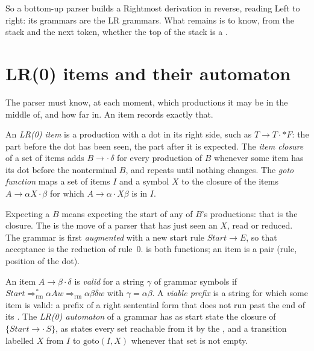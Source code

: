 So a bottom-up parser builds a Rightmost derivation in reverse, reading Left to right: its grammars are the LR grammars. What remains is to know, from the stack and the next token, whether the top of the stack is a .

\section{LR(0) items and their automaton}\label{sec:b3:bottom-up-parsing:items}

The parser must know, at each moment, which productions it may be in the middle of, and how far in. An item records exactly that.

\begin{definition}\label{def:b3:bottom-up-parsing:items}
An \emph{LR(0) item} is a production with a dot in its right side, such as $T \to T \cdot * F$: the part before the dot has been seen, the part after it is expected. The \emph{item closure} of a set of items adds $B \to \cdot\,\delta$ for every production of $B$ whenever some item has its dot before the nonterminal $B$, and repeats until nothing changes. The \emph{goto function} maps a set of items $I$ and a symbol $X$ to the closure of the items $A \to \alpha X \cdot \beta$ for which $A \to \alpha \cdot X \beta$ is in $I$.
\end{definition}

Expecting a $B$ means expecting the start of any of $B$'s productions: that is the closure. The  is the move of a parser that has just seen an $X$, read or reduced. The grammar is first \emph{augmented} with a new start rule $\mathit{Start} \to E$, so that acceptance is the reduction of rule~0.  is both functions; an item is a pair (rule, position of the dot).

\label{lst:b3:bottom-up-parsing:items}

\begin{definition}\label{def:b3:bottom-up-parsing:automaton}
An item $A \to \beta \cdot \delta$ is \emph{valid} for a string $\gamma$ of grammar symbols if $\mathit{Start} \Rightarrow^*_{\mathrm{rm}} \alpha A w \Rightarrow_{\mathrm{rm}} \alpha\beta\delta w$ with $\gamma = \alpha\beta$. A \emph{viable prefix} is a string for which some item is valid: a prefix of a right sentential form that does not run past the end of its . The \emph{LR(0) automaton} of a grammar has as start state the closure of $\{\mathit{Start} \to \cdot\,S\}$, as states every set reachable from it by the , and a transition labelled $X$ from $I$ to $\mathrm{goto}(I, X)$ whenever that set is not empty.
\end{definition}

